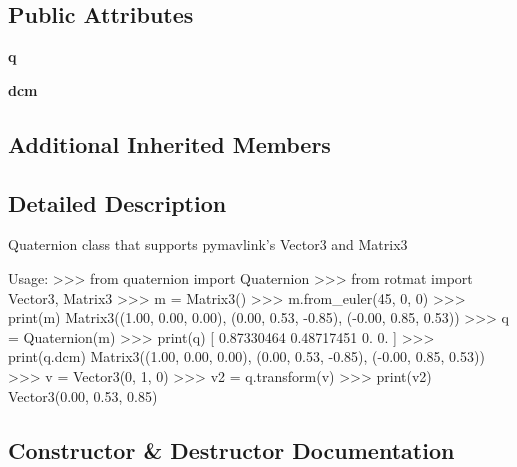 \subsection*{Public Attributes}
\begin{DoxyCompactItemize}
\item 
\mbox{\label{classpymavlink_1_1quaternion_1_1Quaternion_a5c0501ca85af5084c918bc443bb714fd}} 
{\bfseries q}
\item 
\mbox{\label{classpymavlink_1_1quaternion_1_1Quaternion_ad761e43a004cb119c4434cb6779b8206}} 
{\bfseries dcm}
\end{DoxyCompactItemize}
\subsection*{Additional Inherited Members}


\subsection{Detailed Description}
\begin{DoxyVerb}Quaternion class that supports pymavlink's Vector3 and Matrix3

Usage:
    >>> from quaternion import Quaternion
    >>> from rotmat import Vector3, Matrix3
    >>> m = Matrix3()
    >>> m.from_euler(45, 0, 0)
    >>> print(m)
    Matrix3((1.00, 0.00, 0.00), (0.00, 0.53, -0.85), (-0.00, 0.85, 0.53))
    >>> q = Quaternion(m)
    >>> print(q)
    [ 0.87330464  0.48717451  0.          0.        ]
    >>> print(q.dcm)
    Matrix3((1.00, 0.00, 0.00), (0.00, 0.53, -0.85), (-0.00, 0.85, 0.53))
    >>> v = Vector3(0, 1, 0)
    >>> v2 = q.transform(v)
    >>> print(v2)
    Vector3(0.00, 0.53, 0.85)
\end{DoxyVerb}
 

\subsection{Constructor \& Destructor Documentation}
\mbox{\label{classpymavlink_1_1quaternion_1_1Quaternion_ad82c01c2f6c5edc2e25d367624f565c5}} 
